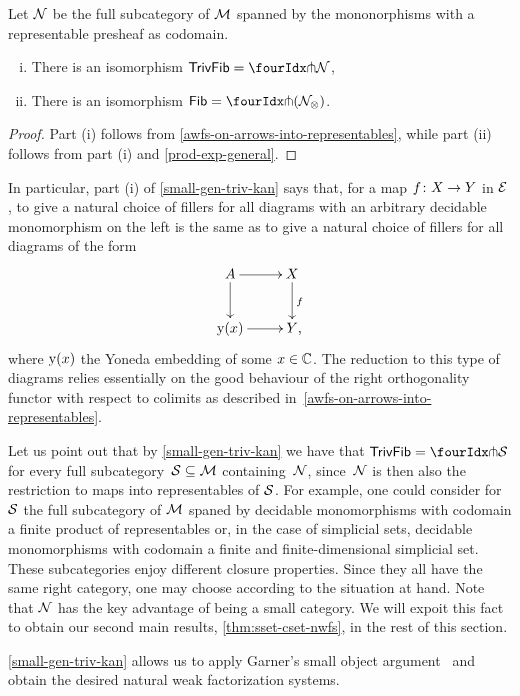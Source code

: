 \documentclass[reqno,10pt,a4paper,oneside,draft]{amsart}
\begin{document}
\begin{theorem} \label{small-gen-triv-kan} Let $\cal{N}$ be the full subcategory of $\cal{M}$ spanned by the mononorphisms with a representable presheaf as codomain.
\begin{enumerate}[(i)]
\item There is an isomorphism $\TrivFib = \liftr{\cal{N}}$,
\item There is an isomorphism $\Fib = \liftr{(\cal{N}_\otimes)}$.
\end{enumerate}
\end{theorem}

\begin{proof} Part (i) follows from \cref{awfs-on-arrows-into-representables}, while
part (ii) follows from part (i) and \cref{prod-exp-general}.
\end{proof}

In particular, part (i) of \cref{small-gen-triv-kan} says that, for a map $f \co X \to Y$ in $\catE$, to give a natural choice of fillers for all diagrams with an arbitrary decidable monomorphism on the left is the same as to give a natural choice of fillers for all diagrams of the form
\[
\xymatrix{
  A
  \ar[r]
  \ar[d]
&
  X
  \ar[d]^f
\\
  \yon(x)
  \ar[r]
&
  Y
\rlap{,}}
\]
where $\yon(x)$ the Yoneda embedding of some $x \in \catC$.
The reduction to this type of diagrams relies essentially on the good behaviour of the right orthogonality functor with respect to colimits as described in~\cref{awfs-on-arrows-into-representables}.

Let us point out that by \cref{small-gen-triv-kan} we have that $\TrivFib = \liftr{\cal{S}}$ for every full subcategory~$\cal{S} \subseteq \cal{M}$ containing~$\cal{N}$, since~$\cal{N}$ is then also the restriction to maps into representables of $\cal{S}$.
For example, one could consider for $\cal{S}$ the full subcategory of $\cal{M}$ spaned by decidable monomorphisms with codomain a finite product of representables or, in the case of simplicial sets, decidable monomorphisms with codomain a finite and finite-dimensional simplicial set.
These subcategories enjoy different closure properties.
Since they all have the same right category, one may choose according to the situation at hand.
Note that $\cal{N}$ has the key advantage of being a small category.
We will expoit this fact to obtain our second main results, \cref{thm:sset-cset-nwfs}, in the rest of this section.



\cref{small-gen-triv-kan} allows us to apply Garner's small object argument~\cite{garner:small-object-argument} and obtain the desired natural weak factorization systems.
\end{document}
